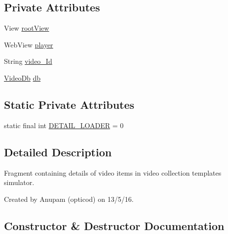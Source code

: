 \subsection*{Private Attributes}
\begin{DoxyCompactItemize}
\item 
View \hyperlink{classorg_1_1buildmlearn_1_1toolkit_1_1videocollectiontemplate_1_1fragment_1_1DetailActivityFragment_ae94e27b4662f4c28748ea668531685bf}{root\+View}
\item 
Web\+View \hyperlink{classorg_1_1buildmlearn_1_1toolkit_1_1videocollectiontemplate_1_1fragment_1_1DetailActivityFragment_a467f0034f7b0371811039e08a656f358}{player}
\item 
String \hyperlink{classorg_1_1buildmlearn_1_1toolkit_1_1videocollectiontemplate_1_1fragment_1_1DetailActivityFragment_a83f2ba1d5cbf50031944c37da8d5d7ff}{video\+\_\+\+Id}
\item 
\hyperlink{classorg_1_1buildmlearn_1_1toolkit_1_1videocollectiontemplate_1_1data_1_1VideoDb}{Video\+Db} \hyperlink{classorg_1_1buildmlearn_1_1toolkit_1_1videocollectiontemplate_1_1fragment_1_1DetailActivityFragment_a0de5d625859d39911a2c5e348a02441f}{db}
\end{DoxyCompactItemize}
\subsection*{Static Private Attributes}
\begin{DoxyCompactItemize}
\item 
static final int \hyperlink{classorg_1_1buildmlearn_1_1toolkit_1_1videocollectiontemplate_1_1fragment_1_1DetailActivityFragment_a757422e41d44c1228abe3cdf36d8adf0}{D\+E\+T\+A\+I\+L\+\_\+\+L\+O\+A\+D\+ER} = 0
\end{DoxyCompactItemize}


\subsection{Detailed Description}
Fragment containing details of video items in video collection template\textquotesingle{}s simulator. 

Created by Anupam (opticod) on 13/5/16. 

\subsection{Constructor \& Destructor Documentation}
